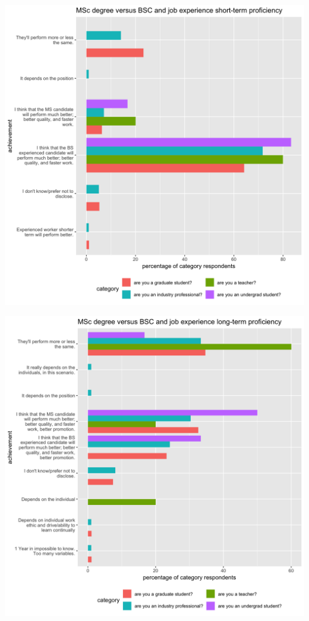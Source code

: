 \documentclass{sigchi}
\begin{document}
\includegraphics[scale=0.2]{../data-analysis/plots_output/MSc_degree_versus_BSC_and_job_experience_short-term_proficiency.png}

\includegraphics[scale=0.2]{../data-analysis/plots_output/MSc_degree_versus_BSC_and_job_experience_long-term_proficiency.png}
\end{document}
